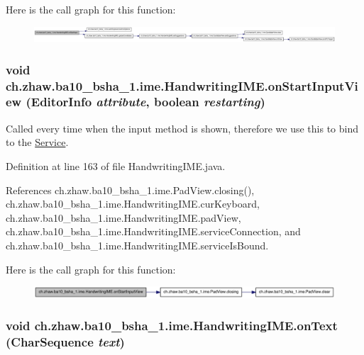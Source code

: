 Here is the call graph for this function:\nopagebreak
\begin{figure}[H]
\begin{center}
\leavevmode
\includegraphics[width=420pt]{classch_1_1zhaw_1_1ba10__bsha__1_1_1ime_1_1HandwritingIME_abb0bfa8e1c7857a88657e6640855af0f_cgraph}
\end{center}
\end{figure}
\hypertarget{classch_1_1zhaw_1_1ba10__bsha__1_1_1ime_1_1HandwritingIME_a731678d503654a151a2204665ec2f018}{
\subsubsection[{onStartInputView}]{\setlength{\rightskip}{0pt plus 5cm}void ch.zhaw.ba10\_\-bsha\_\-1.ime.HandwritingIME.onStartInputView (EditorInfo {\em attribute}, \/  boolean {\em restarting})}}
\label{classch_1_1zhaw_1_1ba10__bsha__1_1_1ime_1_1HandwritingIME_a731678d503654a151a2204665ec2f018}
Called every time when the input method is shown, therefore we use this to bind to the \hyperlink{}{Service}. 

Definition at line 163 of file HandwritingIME.java.

References ch.zhaw.ba10\_\-bsha\_\-1.ime.PadView.closing(), ch.zhaw.ba10\_\-bsha\_\-1.ime.HandwritingIME.curKeyboard, ch.zhaw.ba10\_\-bsha\_\-1.ime.HandwritingIME.padView, ch.zhaw.ba10\_\-bsha\_\-1.ime.HandwritingIME.serviceConnection, and ch.zhaw.ba10\_\-bsha\_\-1.ime.HandwritingIME.serviceIsBound.

Here is the call graph for this function:\nopagebreak
\begin{figure}[H]
\begin{center}
\leavevmode
\includegraphics[width=399pt]{classch_1_1zhaw_1_1ba10__bsha__1_1_1ime_1_1HandwritingIME_a731678d503654a151a2204665ec2f018_cgraph}
\end{center}
\end{figure}
\hypertarget{classch_1_1zhaw_1_1ba10__bsha__1_1_1ime_1_1HandwritingIME_aaa0fc01a36b17c423c223f0dce23390d}{
\subsubsection[{onText}]{\setlength{\rightskip}{0pt plus 5cm}void ch.zhaw.ba10\_\-bsha\_\-1.ime.HandwritingIME.onText (CharSequence {\em text})}}
\label{classch_1_1zhaw_1_1ba10__bsha__1_1_1ime_1_1HandwritingIME_aaa0fc01a36b17c423c223f0dce23390d}


